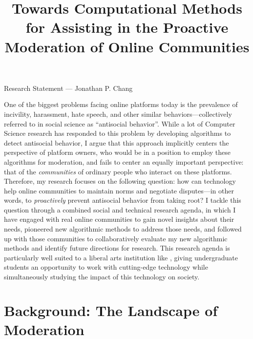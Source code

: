 \documentclass[11pt,letterpaper]{article}
\title{Towards Computational Methods for Assisting in the Proactive Moderation of Online Communities}
\begin{document}
\maketitle

\begin{center}
Research Statement --- Jonathan P. Chang
\end{center}

One of the biggest problems facing online platforms today is the prevalence of incivility, harassment, hate speech, and other similar behaviors---collectively referred to in social science as ``antisocial behavior''.
While a lot of Computer Science research has responded to this problem by developing algorithms to detect antisocial behavior, I argue that this approach implicitly centers the perspective of platform owners, who would be in a position to employ these algorithms for moderation, and fails to center an equally important perspective: that of the \emph{communities} of ordinary people who interact on these platforms.
Therefore, my research focuses on the following question: how can technology help online communities to maintain norms and negotiate disputes---in other words, to \emph{proactively} prevent antisocial behavior from taking root?
I tackle this question through a combined social and technical research agenda, in which I have engaged with real online communities to gain novel insights about their needs, pioneered new algorithmic methods to address those needs, and followed up with those communities to collaboratively evaluate my new algorithmic methods and identify future directions for research.
\ifliberalarts
This research agenda is particularly well suited to a liberal arts institution like \schoolname, giving undergraduate students an opportunity to work with cutting-edge technology while simultaneously studying the impact of this technology on society.
\else
%
\fi

\section{Background: The Landscape of Moderation}
\end{document}
